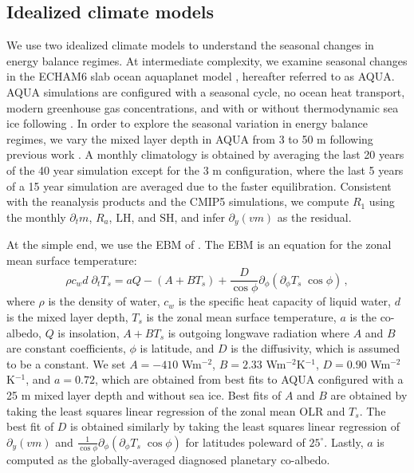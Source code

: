 \documentclass{ametsocV5}
\begin{document}
    \subsection{Idealized climate models}\label{subsec:models}
    We use two idealized climate models to understand the seasonal changes in energy balance regimes. At intermediate complexity, we examine seasonal changes in the ECHAM6 slab ocean aquaplanet model \citep{stevens2013}, hereafter referred to as AQUA. AQUA simulations are configured with a seasonal cycle, no ocean heat transport, modern greenhouse gas concentrations, and with or without thermodynamic sea ice following \cite{shaw2020}. In order to explore the seasonal variation in energy balance regimes, we vary the mixed layer depth in AQUA from 3 to 50 m following previous work \citep{donohoe2014, barpanda2020}. A monthly climatology is obtained by averaging the last 20 years of the 40 year simulation except for the 3 m configuration, where the last 5 years of a 15 year simulation are averaged due to the faster equilibration. Consistent with the reanalysis products and the CMIP5 simulations, we compute $R_1$ using the monthly $\partial_t m$, $R_a$, $\mathrm{LH}$, and $\mathrm{SH}$, and infer $\partial_y (vm) $ as the residual.

    At the simple end, we use the EBM of \cite{rose2017}. The EBM is an equation for the zonal mean surface temperature:
    \begin{equation}
      \rho c_w d \; \partial_t T_s = aQ - (A+BT_s)  + \frac{D}{\cos\phi}\partial_\phi\left( \partial_\phi T_s \; \cos\phi \right)\, ,
    \end{equation}
    where $\rho$ is the density of water, $c_w$ is the specific heat capacity of liquid water, $d$ is the mixed layer depth, $T_s$ is the zonal mean surface temperature, $a$ is the co-albedo, $Q$ is insolation, $A+BT_s$ is outgoing longwave radiation where $A$ and $B$ are constant coefficients, $\phi$ is latitude, and $D$ is the diffusivity, which is assumed to be a constant. We set $A=-410$ Wm$^{-2}$, $B=2.33$ Wm$^{-2}$K$^{-1}$, $D=0.90$ Wm$^{-2}$K$^{-1}$, and $a=0.72$, which are obtained from best fits to AQUA configured with a 25 m mixed layer depth and without sea ice. Best fits of $A$ and $B$ are obtained by taking the least squares linear regression of the zonal mean $\mathrm{OLR}$ and $T_s$. The best fit of $D$ is obtained similarly by taking the least squares linear regression of $\partial_y (vm)$ and $\frac{1}{\cos\phi}\partial_\phi \left(\partial_\phi T_s \; \cos\phi \right)$ for latitudes poleward of $25^\circ$. Lastly, $a$ is computed as the globally-averaged diagnosed planetary co-albedo.
\end{document}
